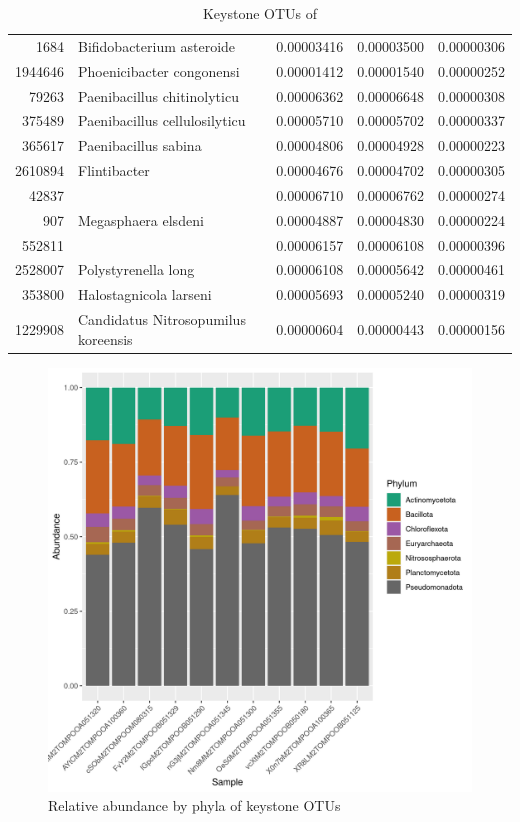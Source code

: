 \begin{table}[ht]
\begin{tabular}{rlrrr}
  1684 & Bifidobacterium asteroide & 0.00003416 & 0.00003500 & 0.00000306 \\ 
  1944646 & Phoenicibacter congonensi & 0.00001412 & 0.00001540 & 0.00000252 \\ 
  79263 & Paenibacillus chitinolyticu & 0.00006362 & 0.00006648 & 0.00000308 \\ 
  375489 & Paenibacillus cellulosilyticu & 0.00005710 & 0.00005702 & 0.00000337 \\ 
  365617 & Paenibacillus sabina & 0.00004806 & 0.00004928 & 0.00000223 \\ 
  2610894 & Flintibacter & 0.00004676 & 0.00004702 & 0.00000305 \\ 
  42837 &   & 0.00006710 & 0.00006762 & 0.00000274 \\ 
  907 & Megasphaera elsdeni & 0.00004887 & 0.00004830 & 0.00000224 \\ 
  552811 &   & 0.00006157 & 0.00006108 & 0.00000396 \\ 
  2528007 & Polystyrenella long & 0.00006108 & 0.00005642 & 0.00000461 \\ 
  353800 & Halostagnicola larseni & 0.00005693 & 0.00005240 & 0.00000319 \\ 
  1229908 & Candidatus Nitrosopumilus koreensis & 0.00000604 & 0.00000443 & 0.00000156 \\ 
   \hline
\end{tabular}
\caption{Keystone OTUs of } 
\end{table}
\begin{figure}
\centering
\includegraphics[scale = 0.8]{tomate_aleatorio1_7.csv_relative_abundance_Phylum.png}
\caption{Relative abundance by phyla of keystone OTUs }
\label{fig:tomate_aleatorio1_7.csv_phyla}
\end{figure}
